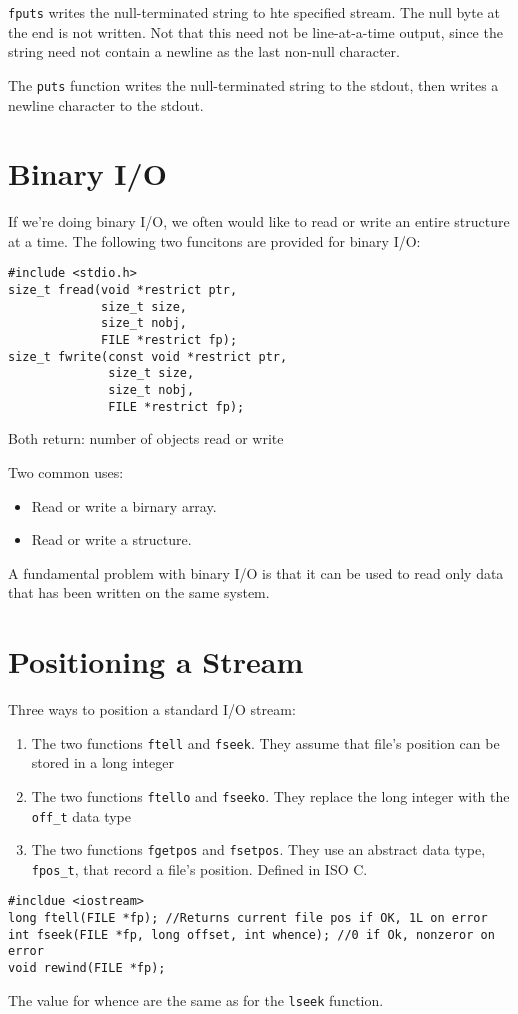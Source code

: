 \documentclass[a4paper,10pt]{book}
\begin{document}
\verb|fputs| writes the null-terminated string to hte specified stream. The null
byte at the end is not written. Not that this need not be line-at-a-time output,
since the string need not contain a newline as the last non-null character.

The \verb|puts| function writes the null-terminated string to the stdout, then
writes a newline character to the stdout.
\section{Binary I/O}
If we're doing binary I/O, we often would like to read or write an entire
structure at a time. The following two funcitons are provided for binary I/O:
\begin{verbatim}
#include <stdio.h>
size_t fread(void *restrict ptr, 
             size_t size,
             size_t nobj,
             FILE *restrict fp);
size_t fwrite(const void *restrict ptr, 
              size_t size, 
              size_t nobj,
              FILE *restrict fp);
\end{verbatim}
Both return: number of objects read or write

Two common uses:
\begin{itemize}
\item Read or write a birnary array.
\item Read or write a structure.
\end{itemize}

A fundamental problem with binary I/O is that it can be used to read only data
that has been written on the same system. 
\section{Positioning a Stream}
Three ways to position a standard I/O stream:
\begin{enumerate}
\item The two functions \verb|ftell| and \verb|fseek|. They assume that
file's position can be stored in a long integer
\item The two functions \verb|ftello| and \verb|fseeko|. They replace the long
integer with the \verb|off_t| data type
\item The two functions \verb|fgetpos| and \verb|fsetpos|. They use an abstract
data type, \verb|fpos_t|, that record a file's position. Defined in ISO C.
\end{enumerate}

\begin{verbatim}
#incldue <iostream>
long ftell(FILE *fp); //Returns current file pos if OK, 1L on error
int fseek(FILE *fp, long offset, int whence); //0 if Ok, nonzeror on error
void rewind(FILE *fp);
\end{verbatim}
The value for whence are the same as for the \verb|lseek| function.
\end{document}
